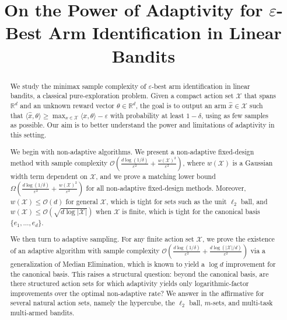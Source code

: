 \documentclass[final,12pt]{colt2026} %
\title[On the Power of Adaptivity for $\varepsilon$-Best Arm Identification in Linear Bandits]{On the Power  of Adaptivity for $\varepsilon$-Best Arm Identification in Linear Bandits}\usepackage{times}
\begin{document}
\maketitle

\begin{abstract}

We study the minimax sample complexity of $\varepsilon$-best arm identification in linear bandits, a classical pure-exploration problem. Given a compact action set $\mathcal{X}$ that spans $\mathbb{R}^d$ and an unknown reward vector $\theta\in\mathbb{R}^d$, the goal is to output an arm $\widehat{x}\in\mathcal{X}$ such that $\langle \widehat{x},\theta\rangle \ge \max_{x\in\mathcal{X}} \langle x,\theta\rangle - \varepsilon$ with probability at least $1-\delta$, using as few samples as possible. Our aim is to better understand the power and limitations of adaptivity in this setting.






We begin with non-adaptive algorithms. We present a non-adaptive fixed-design method with sample complexity $\mathcal{O}\!\left(\frac{d\log(1/\delta)}{\varepsilon^2}+\frac{w(\mathcal{X})^2}{\varepsilon^2}\right)$, where $w(\mathcal{X})$ is a Gaussian width term dependent on $\mathcal{X}$, and we prove a matching lower bound $\Omega\!\left(\frac{d\log(1/\delta)}{\varepsilon^2}+\frac{w(\mathcal{X})^2}{\varepsilon^2}\right)$ for all non-adaptive fixed-design methods. Moreover, $w(\mathcal{X})\le \mathcal{O}(d)$ for general $\mathcal{X}$, which is tight for sets such as the unit $\ell_2$ ball, and $w(\mathcal{X})\le \mathcal{O}(\sqrt{d\log|\mathcal{X}|})$ when $\mathcal{X}$ is finite, which is tight for the canonical basis $\{e_1,\ldots,e_d\}$.



We then turn to adaptive sampling. For any finite action set $\mathcal{X}$, we prove the existence of an adaptive algorithm with sample complexity $\mathcal{O}\!\left(\frac{d\log(1/\delta)}{\varepsilon^2}+\frac{d\log(|\mathcal{X}|/d)}{\varepsilon^2}\right)$ via a generalization of Median Elimination, which is known to yield a $\log d$ improvement for the canonical basis. This raises a structural question: beyond the canonical basis, are there structured action sets for which adaptivity yields only logarithmic-factor improvements over the optimal non-adaptive rate? We answer in the affirmative for several natural action sets, namely the hypercube, the $\ell_2$ ball, $m$-sets, and multi-task multi-armed bandits.






\end{abstract}
\end{document}

